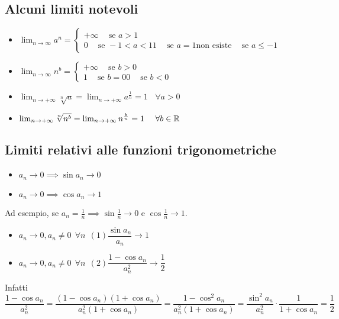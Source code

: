 \documentclass[../../main.tex]{subfiles}
\begin{document}
\subsection{Alcuni limiti notevoli}
\begin{itemize}
    \item $\lim_{n\to\infty}a^n = \begin{cases}
                  +\infty \ \ \ \ \text{ se } a > 1 \\
                  0 \ \ \ \ \text{ se } -1 < a < 1
                  1 \ \ \ \ \text{ se } a = 1
                  \text{non esiste} \ \ \ \ \text{ se } a \leq -1
              \end{cases}$
    \item $\lim_{n\to\infty}n^b = \begin{cases}
                  +\infty \ \ \ \ \text{ se } b > 0 \\
                  1 \ \ \ \ \text{ se } b = 0
                  0 \ \ \ \ \text{ se } b < 0
              \end{cases}$
    \item $\lim_{n\to+\infty}\sqrt[n]{a} = \lim_{n\to+\infty}a^{\frac{1}{n}} = 1 \ \ \ \ \forall a > 0$
    \item $\lim_{n\to+\infty}\sqrt[n]{n^b} = \lim_{n\to+\infty}n^{\frac{b}{n}} = 1 \ \ \ \ \forall b \in \mathbb{R}$
\end{itemize}

\subsection{Limiti relativi alle funzioni trigonometriche}
\begin{itemize}
    \item $a_n\to0 \implies \sin a_n \to 0$
    \item $a_n\to0 \implies \cos a_n \to 1$
\end{itemize}
Ad esempio, se $a_n = \frac{1}{n} \implies \sin\frac{1}{n} \to 0$ e $\cos\frac{1}{n} \to 1$.
\begin{itemize}
    \item $a_n\to0, a_n\ne0 \ \ \forall n \ \ (1) \dfrac{\sin a_n}{a_n} \to 1$
    \item $a_n\to0, a_n\ne0 \ \ \forall n \ \ (2) \dfrac{1-\cos a_n}{a_n^2} \to \dfrac{1}{2}$
\end{itemize}
Infatti $\dfrac{1-\cos a_n}{a_n^2} = \dfrac{(1-\cos a_n)(1+\cos a_n)}{a_n^2(1+\cos a_n)} = \dfrac{1-\cos^2 a_n}{a_n^2(1+\cos a_n)} = \dfrac{\sin^2 a_n}{a_n^2}\cdot \dfrac{1}{1+\cos a_n} = \dfrac{1}{2}$
\end{document}
